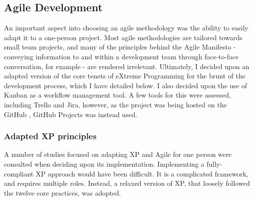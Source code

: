 \subsection{Agile Development}

An important aspect into choosing an agile methodology was the ability to easily adapt it to a one-person project. Most agile methodologies are tailored towards small team projects, and many of the principles behind the Agile Manifesto - conveying information to and within a development team through face-to-face conversation, for example - are rendered irrelevant. Ultimately, I decided upon an adapted version of the core tenets of eXtreme Programming for the brunt of the development process, which I have detailed below. I also decided upon the use of Kanban as a workflow management tool. A few tools for this were assessed, including Trello and Jira, however, as the project was being hosted on the GitHub , GitHub Projects was instead used. 

\subsubsection{Adapted XP principles}
\label{xp}

A number of studies focused on adapting XP and Agile for one person were consulted when deciding upon its implementation\cite{Nystrom2011}. Implementing a fully-compliant XP approach would have been difficult. It is a complicated framework, and requires multiple roles. Instead, a relaxed version of XP, that loosely followed the twelve core practices, was adopted\cite{Agarwal2008}.

